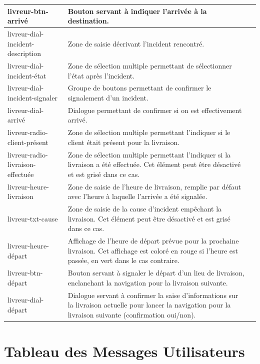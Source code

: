 \documentclass{report}
\begin{document}
\begin{longtable}{|p{5cm}|p{5cm}|c|}
livreur-btn-arrivé&Bouton servant à indiquer l'arrivée à la destination.&\\\hline
livreur-dial-incident-description&Zone de saisie décrivant l'incident rencontré.&\\\hline
livreur-dial-incident-état&Zone de sélection multiple permettant de sélectionner l'état après l'incident.&\\\hline
livreur-dial-incident-signaler&Groupe de boutons permettant de confirmer le signalement d'un incident.&\\\hline
livreur-dial-arrivé&Dialogue permettant de confirmer si on est effectivement arrivé.&\\\hline
livreur-radio-client-présent&Zone de sélection multiple permettant l'indiquer si le client était présent pour la livraison.&\\\hline
livreur-radio-livraison-effectuée&Zone de sélection multiple permettant l'indiquer si la livraison a été effectuée. Cet élément peut être désactivé et est grisé dans ce cas.&\\\hline
livreur-heure-livraison&Zone de saisie de l'heure de livraison, remplie par défaut avec l'heure à laquelle l'arrivée a été signalée.&\\\hline
livreur-txt-cause&Zone de saisie de la cause d'incident empêchant la livraison. Cet élément peut être désactivé et est grisé dans ce cas.&\\\hline
livreur-heure-départ&Affichage de l'heure de départ prévue pour la prochaine livraison. Cet affichage est coloré en rouge si l'heure est passée, en vert dans le cas contraire.&\\\hline
livreur-btn-départ&Bouton servant à signaler le départ d'un lieu de livraison, enclanchant la navigation pour la livraison suivante.&\\\hline
livreur-dial-départ&Dialogue servant à confirmer la saise d'informations sur la livraison actuelle pour lancer la navigation pour la livraison suivante (confirmation oui/non).&\\\hline
\end{longtable}



\section{Tableau des Messages Utilisateurs}
\end{document}
